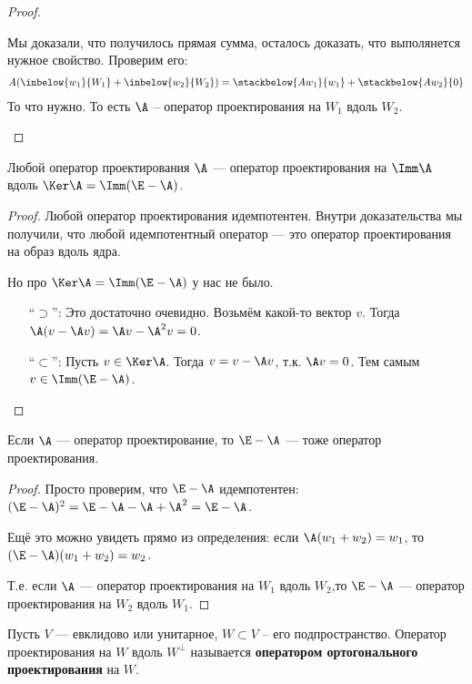 \begin{theorem}
\begin{proof}
\begin{itemize}
                Мы доказали, что получилось прямая сумма, осталось доказать, что выполянется нужное свойство. Проверим его: 
                \begin{gather*}
                    A(\inbelow{w_1}{W_1}  + \inbelow{w_2}{W_2} ) = \stackbelow{A w_1}{w_1}  + \stackbelow{A w_2}{0}
                \end{gather*}
                То что нужно. То есть $\A$ -- оператор проектирования на $W_1$ вдоль $W_2$. 
        \end{itemize}
    \end{proof}
\end{theorem}

\notice Любой оператор проектирования $\A$ --- оператор проектирования на $\Imm \A$ вдоль $\Ker \A = \Imm(\E - \A)$.
\begin{proof}
    Любой оператор проектирования идемпотентен. Внутри доказательства мы получили, что любой идемпотентный оператор --- это оператор  проектирования на образ вдоль ядра.

    Но про $\Ker \A = \Imm(\E - \A)$ у нас не было.
    \begin{itemize}
        \item[``$\supset$'':] Это достаточно очевидно. Возьмём какой-то вектор $v$. Тогда $\A(v - \A v) = \A v - \A^2 v = 0$.

        \item[``$\subset$'':] Пусть $v \in \Ker \A$. Тогда $v = v - \A v$, т.к. $\A v = 0$. Тем самым $v \in \Imm (\E - \A)$.
    \end{itemize}
\end{proof}

\notice Если $\A$ --- оператор проектирование, то $\E - \A$ --- тоже оператор проектирования.
\begin{proof}
    Просто проверим, что $\E - \A$ идемпотентен: $(\E - \A)^2 = \E - \A - \A + \A^2 = \E - \A$.

    Ещё это можно увидеть прямо из определения: если $\A(w_1 + w_2) = w_1$, то $(\E - \A)(w_1 + w_2) = w_2$.

    Т.е. если $\A$ --- оператор проектирования на $W_1$ вдоль $W_2$,то $\E - \A$ --- оператор проектирования на $W_2$ вдоль $W_1$.
\end{proof}

\begin{conj}
    Пусть $V$ --- евклидово или унитарное, $W \subset V$ -- его подпространство. 
    Оператор проектирования на $W$ вдоль $W^{\perp}$ называется \textbf{оператором ортогонального проектирования} на $W$.
\end{conj}

